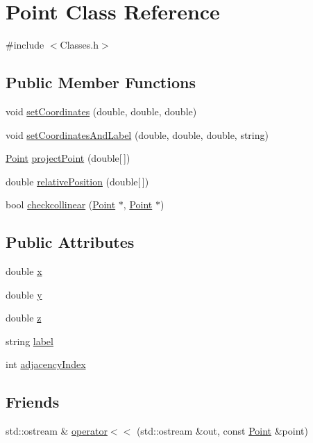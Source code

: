 \hypertarget{class_point}{}\section{Point Class Reference}
\label{class_point}


{\ttfamily \#include $<$Classes.\+h$>$}

\subsection*{Public Member Functions}
\begin{DoxyCompactItemize}
\item 
void \hyperlink{class_point_aa9e5bde544a36d44988c1d544ba4593f}{set\+Coordinates} (double, double, double)
\item 
void \hyperlink{class_point_a6fffe55537a7cbe523ff4e1c33ddb9e5}{set\+Coordinates\+And\+Label} (double, double, double, string)
\item 
\hyperlink{class_point}{Point} \hyperlink{class_point_a209c076529495ad94cf65b8a71d29913}{project\+Point} (double\mbox{[}$\,$\mbox{]})
\item 
double \hyperlink{class_point_a700201e1da138be7e3225b9d2bff50e9}{relative\+Position} (double\mbox{[}$\,$\mbox{]})
\item 
bool \hyperlink{class_point_a72f122fa881e8d9c3ef5d509e6494c3b}{checkcollinear} (\hyperlink{class_point}{Point} $\ast$, \hyperlink{class_point}{Point} $\ast$)
\end{DoxyCompactItemize}
\subsection*{Public Attributes}
\begin{DoxyCompactItemize}
\item 
double \hyperlink{class_point_ab99c56589bc8ad5fa5071387110a5bc7}{x}
\item 
double \hyperlink{class_point_afa38be143ae800e6ad69ce8ed4df62d8}{y}
\item 
double \hyperlink{class_point_a05ba3b1dfcb19430582ae953cbbfbded}{z}
\item 
string \hyperlink{class_point_a1e929419353f9bec46732af977adb55a}{label}
\item 
int \hyperlink{class_point_a6995d9f9ed71b43b711347a3483eb3b9}{adjacency\+Index}
\end{DoxyCompactItemize}
\subsection*{Friends}
\begin{DoxyCompactItemize}
\item 
std\+::ostream \& \hyperlink{class_point_a1296a1b72ce26e73895a0eba4ec65b1d}{operator$<$$<$} (std\+::ostream \&out, const \hyperlink{class_point}{Point} \&point)
\end{DoxyCompactItemize}


